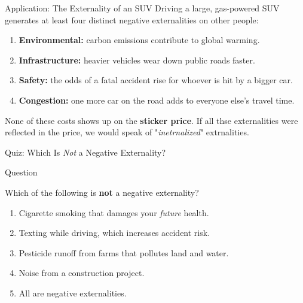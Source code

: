 \documentclass[11pt,aspectratio=169]{beamer}
\begin{document}
\begin{frame}{Application: The Externality of an SUV}
  Driving a large, gas-powered SUV generates at least four distinct negative externalities on other people:
  \begin{enumerate}
    \item \textbf{Environmental:} carbon emissions contribute to global warming.
    \item \textbf{Infrastructure:} heavier vehicles wear down public roads faster.
    \item \textbf{Safety:} the odds of a fatal accident rise for whoever is hit by a bigger car.
    \item \textbf{Congestion:} one more car on the road adds to everyone else's travel time.
  \end{enumerate}
  \vspace{0.3em}
 None of these costs shows up on the \textbf{sticker price}.  If all thse externalities were reflected in the price, we would speak of "\textit{inetrnalized}" extrnalities. 
\end{frame}

\begin{frame}{Quiz: Which Is \emph{Not} a Negative Externality?}
  \begin{block}{Question}
  	  \end{block}
    Which of the following is \textbf{not} a negative externality?

  \begin{enumerate}
    \item[A.] Cigarette smoking that damages your \emph{future} health.
    \item[B.] Texting while driving, which increases accident risk.
    \item[C.] Pesticide runoff from farms that pollutes land and water.
    \item[D.] Noise from a construction project.
    \item[E.] All are negative externalities.
  \end{enumerate}
 
\end{frame}
\end{document}
